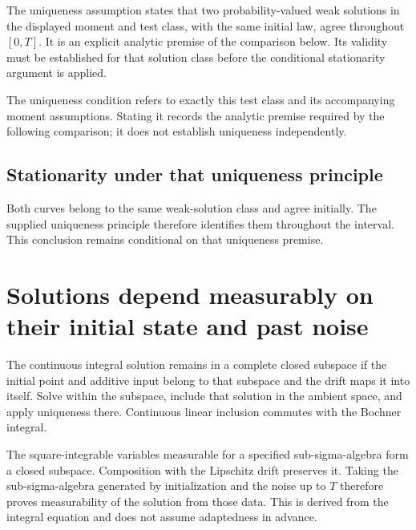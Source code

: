 \documentclass[11pt,a4paper]{report}
\begin{document}
The uniqueness assumption states that two probability-valued weak solutions in the displayed moment and test class, with the same initial law, agree throughout \([0,T]\). It is an explicit analytic premise of the comparison below. Its validity must be established for that solution class before the conditional stationarity argument is applied.



The uniqueness condition refers to exactly this test class and its accompanying moment assumptions. Stating it records the analytic premise required by the following comparison; it does not establish uniqueness independently.

\subsection{\texorpdfstring{Stationarity under that uniqueness principle}{Stationarity under that uniqueness principle}}
\label{report-step-UnadjustedLangevin-FokkerPlanck-lean-4}


Both curves belong to the same weak-solution class and agree initially. The supplied uniqueness principle therefore identifies them throughout the interval. This conclusion remains conditional on that uniqueness premise.

\section{\texorpdfstring{Solutions depend measurably on their initial state and past noise}{Solutions depend measurably on their initial state and past noise}}
\label{proof-module-UnadjustedLangevin-WeakForwardAdapted-lean}


The continuous integral solution remains in a complete closed subspace if the initial point and additive input belong to that subspace and the drift maps it into itself. Solve within the subspace, include that solution in the ambient space, and apply uniqueness there. Continuous linear inclusion commutes with the Bochner integral.



The square-integrable variables measurable for a specified sub-sigma-algebra form a closed subspace. Composition with the Lipschitz drift preserves it. Taking the sub-sigma-algebra generated by initialization and the noise up to \(T\) therefore proves measurability of the solution from those data. This is derived from the integral equation and does not assume adaptedness in advance.
\end{document}
